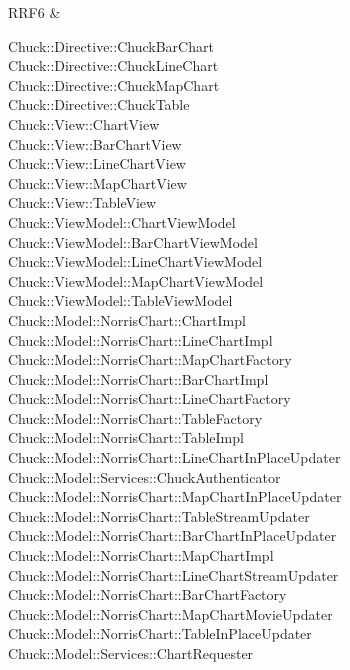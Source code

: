 \begin{longtabu}
                RRF6 & \parbox[t]{10cm}{ Chuck::Directive::ChuckBarChart \\ Chuck::Directive::ChuckLineChart \\ Chuck::Directive::ChuckMapChart \\ Chuck::Directive::ChuckTable \\ Chuck::View::ChartView \\ Chuck::View::BarChartView \\ Chuck::View::LineChartView \\ Chuck::View::MapChartView \\ Chuck::View::TableView \\ Chuck::ViewModel::ChartViewModel \\ Chuck::ViewModel::BarChartViewModel \\ Chuck::ViewModel::LineChartViewModel \\ Chuck::ViewModel::MapChartViewModel \\ Chuck::ViewModel::TableViewModel \\ Chuck::Model::NorrisChart::ChartImpl \\ Chuck::Model::NorrisChart::LineChartImpl \\ Chuck::Model::NorrisChart::MapChartFactory \\ Chuck::Model::NorrisChart::BarChartImpl \\ Chuck::Model::NorrisChart::LineChartFactory \\ Chuck::Model::NorrisChart::TableFactory \\ Chuck::Model::NorrisChart::TableImpl \\ Chuck::Model::NorrisChart::LineChartInPlaceUpdater \\ Chuck::Model::Services::ChuckAuthenticator \\ Chuck::Model::NorrisChart::MapChartInPlaceUpdater \\ Chuck::Model::NorrisChart::TableStreamUpdater \\ Chuck::Model::NorrisChart::BarChartInPlaceUpdater \\ Chuck::Model::NorrisChart::MapChartImpl \\ Chuck::Model::NorrisChart::LineChartStreamUpdater \\ Chuck::Model::NorrisChart::BarChartFactory \\ Chuck::Model::NorrisChart::MapChartMovieUpdater \\ Chuck::Model::NorrisChart::TableInPlaceUpdater \\ Chuck::Model::Services::ChartRequester } \\ 

\end{longtabu}
